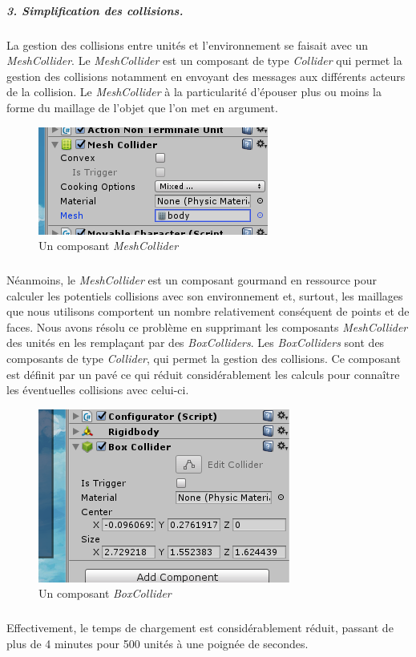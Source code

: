 \documentclass{report}
\begin{document}
\subparagraph{3. Simplification des collisions.} La gestion des collisions entre unités et l'environnement se faisait avec un \textit{MeshCollider}. Le \textit{MeshCollider} est un composant de type \textit{Collider} qui permet la gestion des collisions notamment en envoyant des messages aux différents acteurs de la collision. Le \textit{MeshCollider} à la particularité d'épouser plus ou moins la forme du maillage de l'objet que l'on met en argument.
\begin{figure}[!h]
\centering
\includegraphics{MeshColliderImage}
\caption{Un composant \textit{MeshCollider}}
\end{figure}
\subparagraph{}Néanmoins, le \textit{MeshCollider} est un composant gourmand en ressource pour calculer les potentiels collisions avec son environnement et, surtout, les maillages que nous utilisons comportent un nombre relativement conséquent de points et de faces. Nous avons résolu ce problème en supprimant les composants \textit{MeshCollider} des unités en les remplaçant par des  \textit{BoxColliders}. Les \textit{BoxColliders} sont des composants de type \textit{Collider}, qui permet la gestion des collisions. Ce composant est définit par un pavé ce qui réduit considérablement les calculs pour connaître les éventuelles collisions avec celui-ci.

\begin{figure}[!h]
\centering
\includegraphics{BoxColliderImage}
\caption{Un composant \textit{BoxCollider}}
\end{figure}

\subparagraph{}Effectivement, le temps de chargement est considérablement réduit, passant de plus de 4 minutes pour 500 unités à une poignée de secondes.
\end{document}

